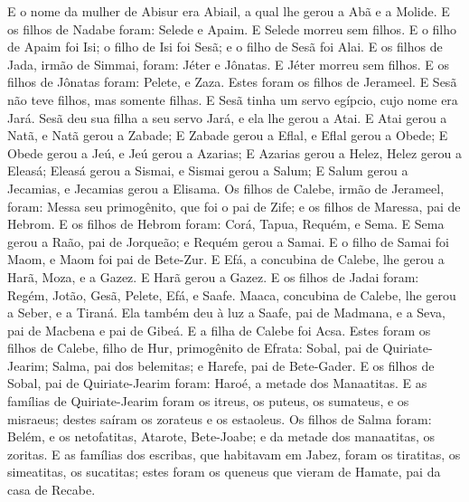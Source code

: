{  E o nome da mulher de Abisur era Abiail, a qual lhe gerou a Abã e a Molide.
  E os filhos de Nadabe foram: Selede e Apaim. E Selede morreu sem filhos.
  E o filho de Apaim foi Isi; o filho de Isi foi Sesã; e o filho de Sesã foi Alai.
  E os filhos de Jada, irmão de Simmai, foram: Jéter e Jônatas. E Jéter morreu sem filhos.
  E os filhos de Jônatas foram: Pelete, e Zaza. Estes foram os filhos de Jerameel.
  E Sesã não teve filhos, mas somente filhas. E Sesã tinha um servo egípcio, cujo nome era Jará.
  Sesã deu sua filha a seu servo Jará, e ela lhe gerou a Atai.
  E Atai gerou a Natã, e Natã gerou a Zabade;
  E Zabade gerou a Eflal, e Eflal gerou a Obede;
  E Obede gerou a Jeú, e Jeú gerou a Azarias;
  E Azarias gerou a Helez, Helez gerou a Eleasá;
  Eleasá gerou a Sismai, e Sismai gerou a Salum;
  E Salum gerou a Jecamias, e Jecamias gerou a Elisama.
  Os filhos de Calebe, irmão de Jerameel, foram: Messa seu primogênito, que foi o pai de Zife; e os filhos de Maressa, pai de Hebrom.
  E os filhos de Hebrom foram: Corá, Tapua, Requém, e Sema.
  E Sema gerou a Raão, pai de Jorqueão; e Requém gerou a Samai.
  E o filho de Samai foi Maom, e Maom foi pai de Bete-Zur.
  E Efá, a concubina de Calebe, lhe gerou a Harã, Moza, e a Gazez. E Harã gerou a Gazez.
  E os filhos de Jadai foram: Regém, Jotão, Gesã, Pelete, Efá, e Saafe.
  Maaca, concubina de Calebe, lhe gerou a Seber, e a Tiraná.
  Ela também deu à luz a Saafe, pai de Madmana, e a Seva, pai de Macbena e pai de Gibeá. E a filha de Calebe foi Acsa.
  Estes foram os filhos de Calebe, filho de Hur, primogênito de Efrata: Sobal, pai de Quiriate-Jearim;
  Salma, pai dos belemitas; e Harefe, pai de Bete-Gader.
  E os filhos de Sobal, pai de Quiriate-Jearim foram: Haroé, a metade dos Manaatitas.
  E as famílias de Quiriate-Jearim foram os itreus, os puteus, os sumateus, e os misraeus; destes saíram os zorateus e os estaoleus.
  Os filhos de Salma foram: Belém, e os netofatitas, Atarote, Bete-Joabe; e da metade dos manaatitas, {} os zoritas.
  E as famílias dos escribas, que habitavam em Jabez, foram os tiratitas, os simeatitas, {} os sucatitas; estes foram os queneus que vieram de Hamate, pai da casa de Recabe.
\par }

